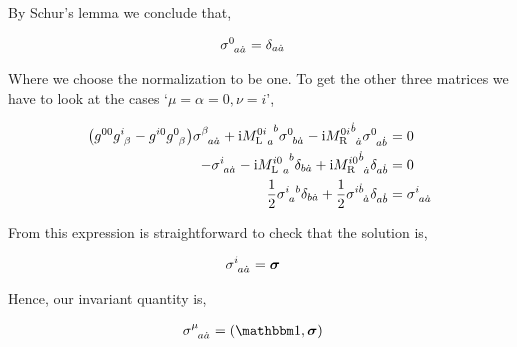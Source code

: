 

By Schur's lemma we conclude that,

\begin{align}
    \tensor{\sigma}{^0_a_{\dot a}}&=\delta_{a\dot a}\nonumber
\end{align}

Where we choose the normalization to be one. To get the other three matrices we have to look at the cases `$\mu=\alpha=0,\nu=i$',

\begin{align}
    \qty(g^{00}\tensor{g}{^i_\beta}- g^{i0}\tensor{g}{^0_\beta})\tensor{\sigma}{^\beta_a_{\dot a}}+\im\tensor{{{M_{\textnormal L}^{0i}}}}{_a^b}\tensor{\sigma}{^0_b_{\dot a}}-\im\tensor{{{M_{\textnormal R}^{0i}}}}{^{\dot b}_{\dot a}}\tensor{\sigma}{^0_a_{\dot b}}&=0\nonumber\\
    -\tensor{\sigma}{^i_a_{\dot a}}-\im\tensor{{{M_{\textnormal L}^{i0}}}}{_a^b}\delta_{b\dot a}+\im\tensor{{{M_{\textnormal R}^{i0}}}}{^{\dot b}_{\dot a}}\delta_{a\dot b}&=0\nonumber\\
    \frac12\tensor{\sigma}{^i_a^b}\delta_{b\dot a}+\frac12\tensor{{\sigma}}{^i^{\dot b}_{\dot a}}\delta_{a\dot b}&=\tensor{\sigma}{^i_a_{\dot a}}\nonumber
\end{align}

From this expression is straightforward to check that the solution is,

\begin{align}
    \tensor{\sigma}{^i_a_{\dot a}}&=\boldsymbol\sigma\nonumber
\end{align}

Hence, our invariant quantity is,

\begin{align}
    \tensor{\sigma}{^\mu_a_{\dot a}}&=\qty(\mathbbm 1,\boldsymbol \sigma)\nonumber
\end{align}

